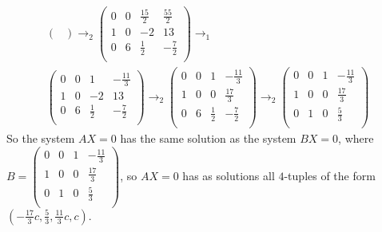 \begin{example}
\begin{enumerate}
\begin{align*}
\begin{pmatrix}
            \end{pmatrix}
            \rightarrow_2
            \begin{pmatrix}
                0 & 0 & \frac{15}{2} & \frac{55}{2} \\
                1 & 0 & -2 & 13 \\
                0 & 6 & \frac{1}{2} & -\frac{7}{2} \\
            \end{pmatrix}
            \rightarrow_1 \\
            \begin{pmatrix}
                0 & 0 & 1 & -\frac{11}{3} \\
                1 & 0 & -2 & 13 \\
                0 & 6 & \frac{1}{2} & -\frac{7}{2} \\
            \end{pmatrix}
            \rightarrow_2
            \begin{pmatrix}
                0 & 0 & 1 & -\frac{11}{3} \\
                1 & 0 & 0 & \frac{17}{3} \\
                0 & 6 & \frac{1}{2} & -\frac{7}{2} \\
            \end{pmatrix}
            \rightarrow_2
            \begin{pmatrix}
                0 & 0 & 1 & -\frac{11}{3} \\
                1 & 0 & 0 & \frac{17}{3} \\
                0 & 1 & 0 & \frac{5}{3} \\
            \end{pmatrix}
        \end{align*}
    So the system $AX=0$ has the same solution as the system  $BX=0$, where
    $B=\begin{pmatrix}
            0 & 0 & 1 & -\frac{11}{3} \\
            1 & 0 & 0 & \frac{17}{3} \\
            0 & 1 & 0 & \frac{5}{3} \\
        \end{pmatrix}$, so $AX=0$ has as solutions all  $4$-tuples of the form
        $(-\frac{17}{3}c,\frac{5}{3}, \frac{11}{3}c, c)$.		


\end{enumerate}
\end{example}
